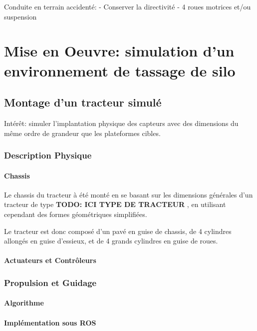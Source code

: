 \documentclass[12pt,a4paper]{report}
\begin{document}
		Conduite en terrain accidenté:
			- Conserver la directivité
			- 4 roues motrices et/ou suspension
			
		
	\section{Mise en Oeuvre: simulation d'un environnement de tassage de silo}
		\subsection{Montage d'un tracteur simulé}
		Intérêt: simuler l'implantation physique des capteurs avec des dimensions du même ordre de grandeur que les plateformes cibles.
		
		\subsubsection{Description Physique}
			\paragraph{Chassis}
			Le chassis du tracteur à été monté en se basant sur les dimensions générales d'un tracteur de type \textbf{TODO: ICI TYPE DE TRACTEUR} , en utilisant cependant des formes géométriques simplifiées.
			\newline
			
			Le tracteur est donc composé d'un pavé en guise de chassis, de 4 cylindres allongés en guise d'essieux, et de 4 grands cylindres en guise de roues.
			
			\paragraph{Actuateurs et Contrôleurs}
		\subsubsection{Propulsion et Guidage}
			\paragraph{Algorithme}
			
			
			\paragraph{Implémentation sous ROS}
			
\end{document}
